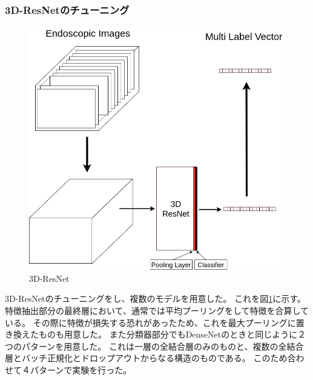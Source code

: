 \subsubsection{3D-ResNetのチューニング}

\begin{figure}[tb]
    \begin{center}
        \includegraphics[width=150mm]{./fig/ieice3.png}
        \caption{3D-ResNet}
        \label{fig:3d_resnet}
    \end{center}
\end{figure}

3D-ResNetのチューニングをし、複数のモデルを用意した。
これを図\ref{fig:3d_resnet}に示す。
特徴抽出部分の最終層において、通常では平均プーリングをして特徴を合算している。
その際に特徴が損失する恐れがあったため、これを最大プーリングに置き換えたものも用意した。
また分類器部分でもDenseNetのときと同じように２つのパターンを用意した。
これは一層の全結合層のみのものと、複数の全結合層とバッチ正規化とドロップアウトからなる構造のものである。
このため合わせて４パターンで実験を行った。
